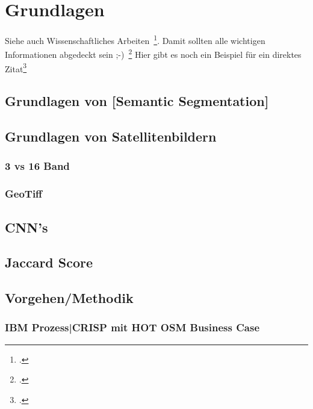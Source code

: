 \newpage
\section{Grundlagen} \label{sec:grundlagen}
Siehe auch Wissenschaftliches Arbeiten~\footcite[\vglf][S. 1]{Balzert.2008}. %
Damit sollten alle wichtigen Informationen abgedeckt sein ;-)~\footcite[\vglf][]{Balzert.2008} %
Hier gibt es noch ein Beispiel für ein direktes Zitat\footcite[][]{Balzert.2008} %

\subsection{Grundlagen von [Semantic Segmentation]}
\subsection{Grundlagen von Satellitenbildern}
\subsubsection{3 vs 16 Band}
\subsubsection{GeoTiff}
\subsection{CNN's}
\subsection{Jaccard Score}
\subsection{Vorgehen/Methodik}
\subsubsection{IBM Prozess|CRISP mit HOT OSM Business Case}